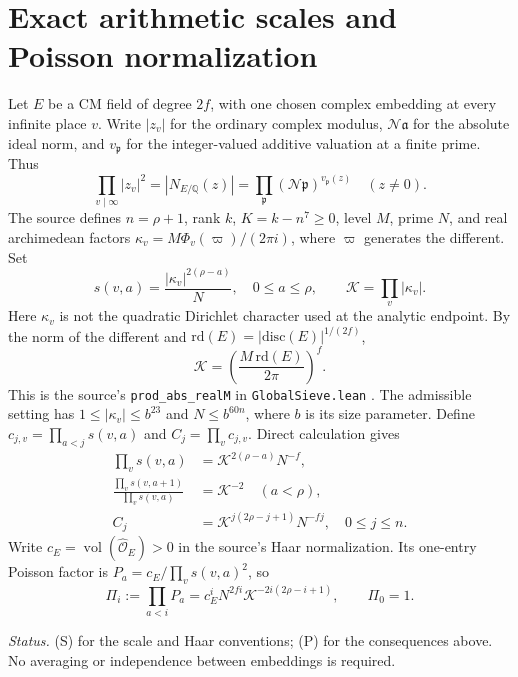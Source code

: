 \documentclass[11pt,a4paper]{article}
\newcommand{\N}{\mathcal N}\newcommand{\OO}{\mathcal O}\newcommand{\KK}{\mathscr K}\newcommand{\Tr}{\operatorname{tr}}\newcommand{\rk}{\operatorname{rank}}\newcommand{\len}{\operatorname{length}}\newcommand{\diag}{\operatorname{diag}}\newcommand{\vol}{\operatorname{vol}}\newcommand{\Id}{\mathrm I}\newcommand{\vG}{v_{\mathrm G}}\newcommand{\supp}{\operatorname{supp}}\newcommand{\status}[1]{\par\smallskip\noindent\textit{Status.} #1\par\smallskip}
\begin{document}
\section{Exact arithmetic scales and Poisson normalization}\label{sec:scales}
Let $E$ be a CM field of degree $2f$, with one chosen complex embedding at every infinite place $v$. Write $|z_v|$ for the ordinary complex modulus, $\N\mathfrak a$ for the absolute ideal norm, and $v_{\mathfrak p}$ for the integer-valued additive valuation at a finite prime. Thus
\begin{equation}\label{eq:norm}
\prod_{v\mid\infty}|z_v|^2=|N_{E/\mathbb Q}(z)|=\prod_{\mathfrak p}(\N\mathfrak p)^{v_{\mathfrak p}(z)}\quad(z\ne0).
\end{equation}
The source defines $n=\rho+1$, rank $k$, $K=k-n^7\geq0$, level $M$, prime $N$, and real archimedean factors $\kappa_v=M\Phi_v(\varpi)/(2\pi i)$, where $\varpi$ generates the different. Set
\begin{equation}
s(v,a)=\frac{|\kappa_v|^{2(\rho-a)}}{N},\quad 0\leq a\leq\rho,\qquad \KK=\prod_v|\kappa_v|.
\end{equation}
Here $\kappa_v$ is not the quadratic Dirichlet character used at the analytic endpoint. By the norm of the different and $\mathrm{rd}(E)=|\mathrm{disc}(E)|^{1/(2f)}$,
\begin{equation}\label{eq:kappa}
\KK=\left(\frac{M\,\mathrm{rd}(E)}{2\pi}\right)^f.
\end{equation}
This is the source's \texttt{prod\_\allowbreak abs\_\allowbreak realM} in \texttt{GlobalSieve.lean} \cite{globalsieve}. The admissible setting has $1\leq|\kappa_v|\leq b^{23}$ and $N\leq b^{60n}$, where $b$ is its size parameter. Define $c_{j,v}=\prod_{a<j}s(v,a)$ and $C_j=\prod_v c_{j,v}$. Direct calculation gives
\begin{align}
\prod_v s(v,a)&=\KK^{2(\rho-a)}N^{-f},\\
\frac{\prod_v s(v,a+1)}{\prod_v s(v,a)}&=\KK^{-2}\quad(a<\rho),\\
C_j&=\KK^{j(2\rho-j+1)}N^{-fj},\quad 0\leq j\leq n.\label{eq:prefix}
\end{align}
Write $c_E=\vol(\widehat{\OO}_E)>0$ in the source's Haar normalization. Its one-entry Poisson factor is $P_a=c_E/\prod_v s(v,a)^2$, so
\begin{equation}\label{eq:poissprod}
\Pi_i:=\prod_{a<i}P_a=c_E^i N^{2fi}\KK^{-2i(2\rho-i+1)},\qquad \Pi_0=1.
\end{equation}
\status{(S) for the scale and Haar conventions; (P) for the consequences above. No averaging or independence between embeddings is required.}
\end{document}
